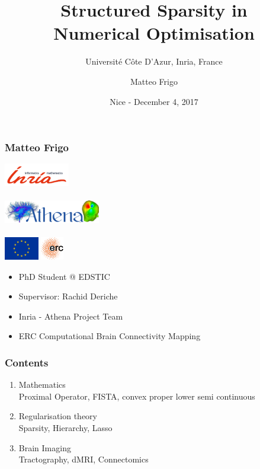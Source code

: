 \documentclass[aspectratio=169]{beamer}
\title{Structured Sparsity in\\Numerical Optimisation}
\subtitle{Universit\'{e} C\^ote D'Azur, Inria, France}
\author{Matteo Frigo}
\date{Nice - December 4, 2017}
\begin{document}
	\frame{\titlepage}
	
	\begin{frame}
	\frametitle{Matteo Frigo}
	\begin{minipage}{.45\textwidth}
	\begin{center}
	\includegraphics[height=1cm,keepaspectratio]{img/logo_inria}\\ \quad \\
	\includegraphics[height=1cm,keepaspectratio]{img/athena-logo}\\ \quad \\
	\includegraphics[height=1cm,keepaspectratio]{img/flag_yellow_high}\qquad
	\includegraphics[height=1cm,keepaspectratio]{img/erc_logo}
	\end{center}
	\end{minipage}
	\quad
	\begin{minipage}{.45\textwidth}
	\begin{itemize}
	\item PhD Student @ EDSTIC
	\item Supervisor: Rachid Deriche
	\item Inria - Athena Project Team
	\item ERC Computational Brain Connectivity Mapping 
	\end{itemize}
	\end{minipage}
	\end{frame}
	
	\begin{frame}
		\frametitle{Contents}
		\begin{enumerate}
			\item Mathematics \\ \textcolor{ExecusharesGrey}{\footnotesize\hspace{1em} Proximal Operator, FISTA, convex proper lower semi continuous}
			\item Regularisation theory  \\ \textcolor{ExecusharesGrey}{\footnotesize\hspace{1em} Sparsity, Hierarchy, Lasso}
			\item Brain Imaging \\ \textcolor{ExecusharesGrey}{\footnotesize\hspace{1em} Tractography, dMRI, Connectomics}
		\end{enumerate}
	\end{frame}
	
\end{document}
